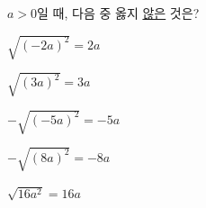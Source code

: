 $a>0$일 때, 다음 중 옳지 \underline{않은} 것은?
\begin{choicesii}{\rule[-3ex]{0pt}{8ex}$\sqrt{(-2a)^2}=2a$}{\rule[-3ex]{0pt}{8ex}$\sqrt{(3a)^2}=3a$}{\rule[-3ex]{0pt}{8ex}$-\sqrt{(-5a)^2}=-5a$}{\rule[-3ex]{0pt}{8ex}$-\sqrt{(8a)^2}=-8a$}{\rule[-3ex]{0pt}{8ex}$\sqrt{16a^2}=16a$}\end{choicesii}
